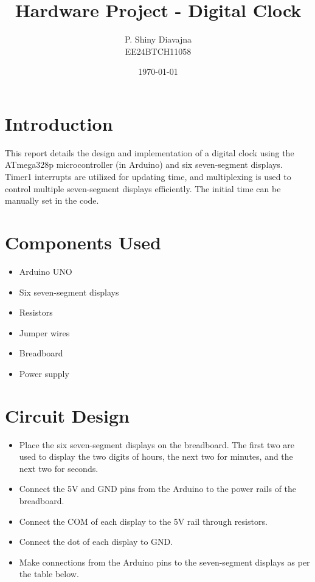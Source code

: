 \documentclass{article}
\title{\textbf{Hardware Project - Digital Clock }}
\author{P. Shiny Diavajna\\ EE24BTCH11058}
\date{\today}
\begin{document}
\maketitle

\section{Introduction}
This report details the design and implementation of a digital clock using the ATmega328p microcontroller (in Arduino) and six seven-segment displays. Timer1 interrupts are utilized for updating time, and multiplexing is used to control multiple seven-segment displays efficiently. The initial time can be manually set in the code.

\section{Components Used}
\begin{itemize}
    \item Arduino UNO
    \item Six seven-segment displays
    \item Resistors
    \item Jumper wires
    \item Breadboard
    \item Power supply
\end{itemize}

\section{Circuit Design}
\begin{itemize}
    \item Place the six seven-segment displays on the breadboard. The first two are used to display the two digits of hours, the next two for minutes, and the next two for seconds.
    \item Connect the 5V and GND pins from the Arduino to the power rails of the breadboard.
    \item Connect the COM of each display to the 5V rail through resistors.
    \item Connect the dot of each display to GND.
    \item Make connections from the Arduino pins to the seven-segment displays as per the table below.
\end{itemize}


\end{document}
